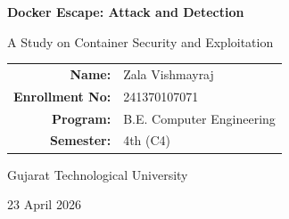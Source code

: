 \documentclass[12pt]{report}
\begin{document}
\begin{titlepage}
    \centering

    \vspace*{2cm}

    {\Huge \bfseries Docker Escape: Attack and Detection\par}
    \vspace{1cm}

    {\Large A Study on Container Security and Exploitation\par}

    \vspace{2cm}

    {\large
    \begin{tabular}{rl}
        \textbf{Name:} & Zala Vishmayraj \\
        \textbf{Enrollment No:} & 241370107071 \\
        \textbf{Program:} & B.E. Computer Engineering \\
        \textbf{Semester:} & 4th (C4) \\
    \end{tabular}
    }

    \vspace{2cm}


    \vfill

    {\large
    Gujarat Technological University
    }

    \vspace{0.5cm}

    {\large 23 April 2026}

\end{titlepage}

\tableofcontents
\newpage
















\end{document}
